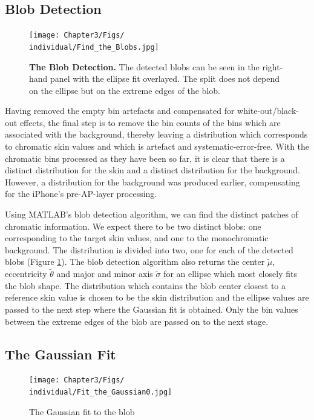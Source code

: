 \subsection{Blob Detection}\label{sec:BlobDetection}

\begin{figure}[h!]
  \centering
    \texttt{[image: Chapter3/Figs/\\individual/Find\_the\_Blobs.jpg]}
        \caption{\textbf{The Blob Detection.} The detected blobs can be seen in the right-hand panel with the ellipse fit overlayed. The split does not depend on the ellipse but on the extreme edges of the blob.} \label{fig:Find_the_Blobs}
    \end{figure}
    
Having removed the empty bin artefacts and compensated for white-out/black-out effects, the final step is to remove the bin counts of the bins which are associated with the background, thereby leaving a distribution which corresponds to chromatic skin values and which is artefact and systematic-error-free. With the chromatic bins processed as they have been so far, it is clear that there is a distinct distribution for the skin and a distinct distribution for the background. However, a distribution for the background was produced earlier, compensating for the iPhone's pre-AP-layer processing. 

Using MATLAB's blob detection algorithm, we can find the distinct patches of chromatic information. We expect there to be two distinct blobs: one corresponding to the target skin values, and one to the monochromatic background. The distribution is divided into two, one for each of the detected blobs (Figure \ref{fig:Find_the_Blobs}). The blob detection algorithm also returns the center $\widetilde{\mu}$, eccentricity $\widetilde{\theta}$ and major and minor axis $\widetilde{\sigma}$ for an ellipse which most closely fits the blob shape. The distribution which contains the blob center closest to a reference skin value is chosen to be the skin distribution and the ellipse values are passed to the next step where the Gaussian fit is obtained. Only the bin values between the extreme edges of the blob are passed on to the next stage.

\subsection{The Gaussian Fit}\label{sec:TheGaussianFit}

\begin{figure}[h!] %
  \centering
    \texttt{[image: Chapter3/Figs/\\individual/Fit\_the\_Gaussian0.jpg]}
        \caption{The Gaussian fit to the blob}  \label{fig:Fit_the_Gaussian0}
    \end{figure}


